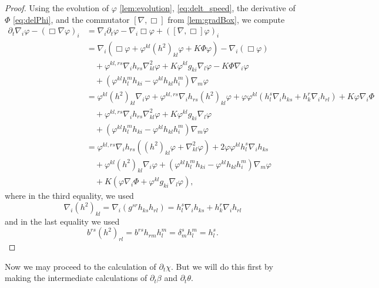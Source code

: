 \documentclass{amsart}
\begin{document}
\begin{proof}
Using the evolution of \(\varphi\) \cref{lem:evolution}, \cref{eq:delt_speed}, the derivative of \(\Phi\) \cref{eq:delPhi}, and the commutator \([\nabla, \Box]\) from \cref{lem:gradBox}, we compute
\[
\begin{split}
\partial_{t}\nabla_i \varphi - (\Box\nabla \varphi)_{i} &= \nabla_i \partial_t \varphi - \nabla_i \Box \varphi + ([\nabla, \Box] \varphi)_i \\
&= \nabla_i \left(\Box\varphi + \varphi^{kl}(h^2)_{kl}\varphi + K \Phi\varphi\right) - \nabla_i (\Box\varphi) \\
&\quad + \varphi^{kl,rs} \nabla_i h_{rs} \nabla^2_{kl} \varphi + K\varphi^{kl}g_{ki} \nabla_l \varphi - K\Phi\nabla_i \varphi \\
&\quad + (\varphi^{kl}h^{m}_{l}h_{ki} - \varphi^{kl}h_{kl}h^{m}_{i}) \nabla_m \varphi \\
&= \varphi^{kl}(h^2)_{kl}\nabla_i \varphi + \varphi^{kl,rs}\nabla_i h_{rs} (h^2)_{kl}\varphi + \varphi\varphi^{kl}(h^s_l \nabla_i h_{ks} + h^r_k \nabla_i h_{rl}) + K \varphi\nabla_i\Phi \\
&\quad + \varphi^{kl,rs} \nabla_i h_{rs} \nabla^2_{kl} \varphi + K\varphi^{kl}g_{ki}\nabla_l \varphi \\
&\quad + (\varphi^{kl}h^{m}_{l}h_{ki} - \varphi^{kl}h_{kl}h^{m}_{i}) \nabla_m \varphi \\
&= \varphi^{kl,rs}\nabla_i h_{rs} \left((h^2)_{kl}\varphi + \nabla^2_{kl} \varphi\right) + 2 \varphi\varphi^{kl} h^s_l \nabla_i h_{ks} \\
&\quad + \varphi^{kl}(h^2)_{kl}\nabla_i \varphi + (\varphi^{kl}h^{m}_{l}h_{ki} - \varphi^{kl}h_{kl}h^{m}_{i}) \nabla_m \varphi \\
&\quad + K \left(\varphi\nabla_i\Phi + \varphi^{kl}g_{ki}\nabla_l \varphi\right),
\end{split}
\]
where in the third equality, we used
\[
\nabla_i (h^2)_{kl} = \nabla_i (g^{sr} h_{ks} h_{rl}) = h^s_l \nabla_i h_{ks} + h^r_k \nabla_i h_{rl}
\]
and in the last equality we used
\[
b^{rs} (h^2)_{rl} = b^{rs} h_{rm} h^m_l = \delta^s_m h^m_l = h^s_l.
\]
\end{proof}

Now we may proceed to the calculation of \(\partial_t \chi\). But we will do this first by making the intermediate calculations of \(\partial_t \beta\) and \(\partial_t \theta\).
\end{document}
